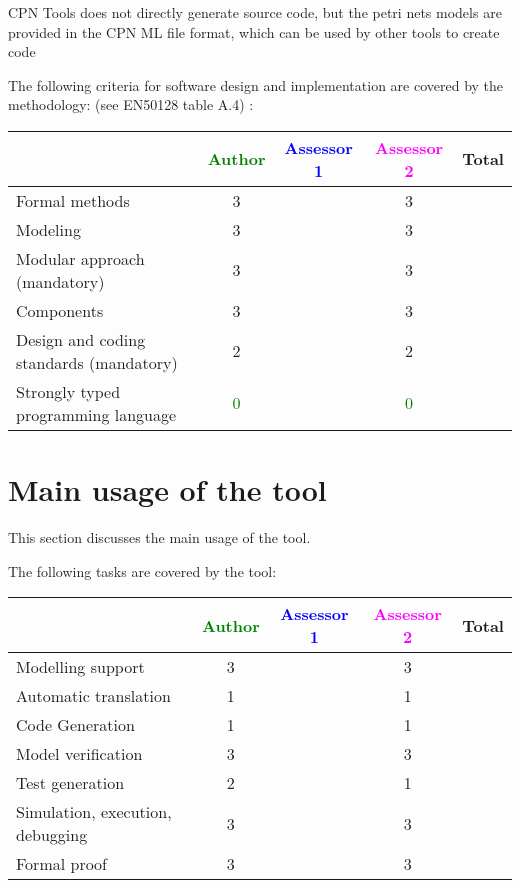 CPN Tools does not directly generate source code, but the petri nets models are provided in the CPN ML file format, which can be used by other tools to create code

The following criteria for software design and implementation are covered by the methodology:
(see EN50128 table A.4) :

\begin{tabular}{|l | c | c | c | c|}
\hline
& \textcolor{green}{Author} & \textcolor{blue}{Assessor 1} & \textcolor{magenta}{Assessor 2} & Total \\
\hline
Formal methods  & 3    & & 3    &  \\
\hline 
Modeling  & 3    & & 3    &  \\
\hline
Modular approach (mandatory) & 3    & & 3    &  \\
\hline
Components & 3    & & 3    &  \\
\hline
Design and coding standards (mandatory) & 2    & & 2    &  \\
\hline
Strongly typed programming language & \textcolor{green}{0} & & \textcolor{green}{0} &  \\
\hline

\end{tabular}



\section{Main usage of the tool}
\label{main_usage}

This section discusses the main usage of the tool.

The following tasks are covered by the tool:


\begin{tabular}{|l | c | c | c | c|}
\hline
& \textcolor{green}{Author} & \textcolor{blue}{Assessor 1} & \textcolor{magenta}{Assessor 2} & Total \\
\hline 
Modelling support & 3    & & 3    &  \\
\hline
Automatic translation  & 1    & & 1    & \\
\hline
Code Generation  & 1    & & 1    & \\
\hline
Model verification & 3    & & 3    & \\
\hline
Test generation & 2    & & 1    & \\
\hline
Simulation, execution, debugging & 3    & & 3    & \\
\hline
Formal proof & 3    & & 3    & \\
\hline
\end{tabular}


